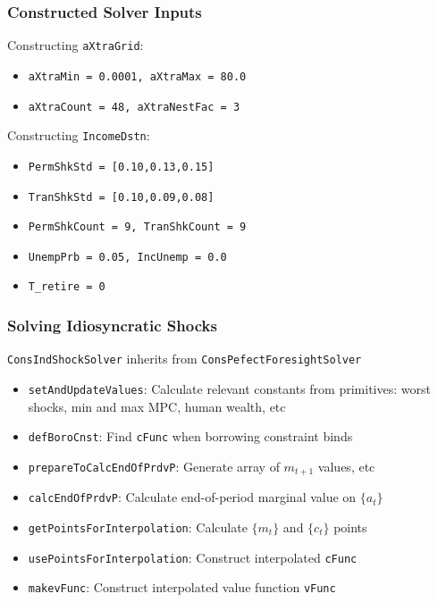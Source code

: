 \documentclass[11pt]{cfpbpresentation}
\begin{document}
\begin{frame}
\frametitle{Constructed Solver Inputs}
Constructing \texttt{aXtraGrid}:
\begin{itemize}
\item \texttt{aXtraMin = 0.0001, \qquad aXtraMax = 80.0}

\item \texttt{aXtraCount = 48, \qquad aXtraNestFac = 3}
\end{itemize}

Constructing \texttt{IncomeDstn}:
\begin{itemize}
\item \texttt{PermShkStd = [0.10,0.13,0.15]}

\item \texttt{TranShkStd = [0.10,0.09,0.08]}

\item \texttt{PermShkCount = 9, \qquad TranShkCount = 9}

\item \texttt{UnempPrb = 0.05, \qquad IncUnemp = 0.0}

\item \texttt{T\_retire = 0}
\end{itemize}
\end{frame}


\begin{frame}
\frametitle{Solving Idiosyncratic Shocks}
\texttt{ConsIndShockSolver} inherits from \texttt{ConsPefectForesightSolver}
\begin{itemize}
\item \texttt{setAndUpdateValues}: Calculate relevant constants from primitives: worst shocks, min and max MPC, human wealth, etc

\item \texttt{defBoroCnst}: Find \texttt{cFunc} when borrowing constraint binds

\item <2->\texttt{prepareToCalcEndOfPrdvP}: Generate array of $m_{t+1}$ values, etc

\item <2->\texttt{calcEndOfPrdvP}: Calculate end-of-period marginal value on $\{a_t\}$

\item <3->\texttt{getPointsForInterpolation}: Calculate $\{m_t\}$ and $\{c_t\}$ points

\item <3->\texttt{usePointsForInterpolation}: Construct interpolated \texttt{cFunc}

\item <4->\texttt{makevFunc}: Construct interpolated value function \texttt{vFunc}
\end{itemize}
\end{frame}
\end{document}
